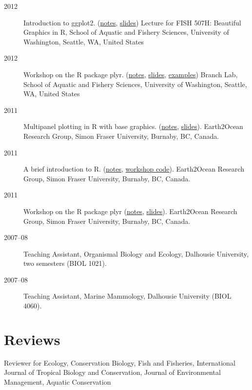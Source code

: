 \begin{description}
\item[2012]
Introduction to ggplot2.
(\href{courses/12-ggplot2/ggplot2_notes.pdf}{notes},
\href{courses/12-ggplot2/ggplot2_slides_with_examples.pdf}{slides})
Lecture for FISH 507H: Beautiful Graphics in R, School of Aquatic and
Fishery Sciences, University of Washington, Seattle, WA, United States
\item[2012]
Workshop on the R package plyr.
(\href{courses/12-plyr/plyr_2012.pdf}{notes},
\href{courses/12-plyr/plyr_2012_slides.pdf}{slides},
\href{courses/12-plyr/plyr_2012_examples.html}{examples}) Branch Lab,
School of Aquatic and Fishery Sciences, University of Washington,
Seattle, WA, United States
\item[2011]
Multipanel plotting in R with base graphics.
(\href{courses/11-multipanel/multipanel.pdf}{notes},
\href{courses/11-multipanel/multipanel-slides.pdf}{slides}). Earth2Ocean
Research Group, Simon Fraser University, Burnaby, BC, Canada.
\item[2011]
A brief introduction to R. (\href{courses/11-rintro/RIntro.pdf}{notes},
\href{courses/11-rintro/RIntro.R}{workshop code}). Earth2Ocean Research
Group, Simon Fraser University, Burnaby, BC, Canada.
\item[2011]
Workshop on the R package plyr (\href{courses/11-plyr/plyr.pdf}{notes},
\href{courses/11-plyr/plyr-slides.pdf}{slides}). Earth2Ocean Research
Group, Simon Fraser University, Burnaby, BC, Canada.
\item[2007--08]
Teaching Assistant, Organismal Biology and Ecology, Dalhousie
University, two semesters (BIOL 1021).
\item[2007--08]
Teaching Assistant, Marine Mammology, Dalhousie University (BIOL 4060).
\end{description}

\section{Reviews}

Reviewer for Ecology, Conservation Biology, Fish and Fisheries,
International Journal of Tropical Biology and Conservation, Journal of
Environmental Management, Aquatic Conservation

